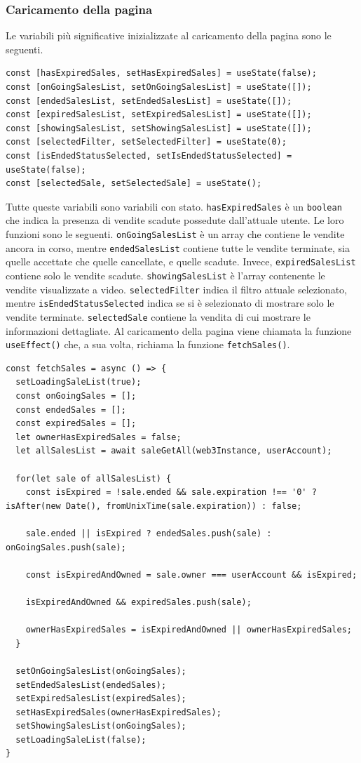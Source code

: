 \documentclass[a4paper]{article}
\begin{document}
        \subsubsection{Caricamento della pagina}
        \label{expiredSales}
        Le variabili più significative inizializzate al caricamento della pagina sono le seguenti.
\begin{lstlisting}[style=ES6, title={Variabili significative di "Sales List"}]
const [hasExpiredSales, setHasExpiredSales] = useState(false);
const [onGoingSalesList, setOnGoingSalesList] = useState([]);
const [endedSalesList, setEndedSalesList] = useState([]);
const [expiredSalesList, setExpiredSalesList] = useState([]);
const [showingSalesList, setShowingSalesList] = useState([]);
const [selectedFilter, setSelectedFilter] = useState(0);
const [isEndedStatusSelected, setIsEndedStatusSelected] = useState(false);
const [selectedSale, setSelectedSale] = useState();\end{lstlisting}
        Tutte queste variabili sono variabili con stato. \verb|hasExpiredSales| è un \verb|boolean| che indica la presenza di vendite scadute possedute dall'attuale utente. Le loro funzioni sono le seguenti.
        \newline
        \verb|onGoingSalesList| è un array che contiene le vendite ancora in corso, mentre \verb|endedSalesList| contiene tutte le vendite terminate, sia quelle accettate che quelle cancellate, e quelle scadute.
        Invece, \verb|expiredSalesList| contiene solo le vendite scadute.
        \verb|showingSalesList| è l'array contenente le vendite visualizzate a video. \verb|selectedFilter| indica il filtro attuale selezionato, mentre \verb|isEndedStatusSelected| indica se si è selezionato di mostrare solo le vendite terminate.
        \verb|selectedSale| contiene la vendita di cui mostrare le informazioni dettagliate.
        Al caricamento della pagina viene chiamata la funzione \verb|useEffect()| che, a sua volta, richiama la funzione \verb|fetchSales()|.
\begin{lstlisting}[style=ES6, title={Funzione fetchSales()}]
const fetchSales = async () => {
  setLoadingSaleList(true);
  const onGoingSales = [];
  const endedSales = [];
  const expiredSales = [];
  let ownerHasExpiredSales = false;
  let allSalesList = await saleGetAll(web3Instance, userAccount);
  
  for(let sale of allSalesList) {
    const isExpired = !sale.ended && sale.expiration !== '0' ? isAfter(new Date(), fromUnixTime(sale.expiration)) : false;

    sale.ended || isExpired ? endedSales.push(sale) : onGoingSales.push(sale);

    const isExpiredAndOwned = sale.owner === userAccount && isExpired;

    isExpiredAndOwned && expiredSales.push(sale);

    ownerHasExpiredSales = isExpiredAndOwned || ownerHasExpiredSales;
  }

  setOnGoingSalesList(onGoingSales);
  setEndedSalesList(endedSales);
  setExpiredSalesList(expiredSales);
  setHasExpiredSales(ownerHasExpiredSales);
  setShowingSalesList(onGoingSales);
  setLoadingSaleList(false);
}\end{lstlisting}
\end{document}
